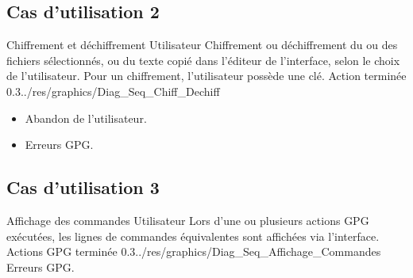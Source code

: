 \documentclass{../res/univ-projet}
\begin{document}
\subsection{Cas d'utilisation 2}
\ficheGraphic
{Chiffrement et déchiffrement}                   %
{Utilisateur}                                    %
{                                                %
  Chiffrement ou déchiffrement du ou des fichiers sélectionnés, ou du texte copié dans l'éditeur de l'interface, selon le choix de l'utilisateur.
}
{                                                %
  Pour un chiffrement, l'utilisateur possède une clé.
}                                               
{}                                               %
{Action terminée}                                %
{0.3}{../res/graphics/Diag_Seq_Chiff_Dechiff} %
{                                                %
  \begin{itemize}
  \item Abandon de l'utilisateur.
  \item Erreurs GPG.
  \end{itemize}
}
\vspace{0.5cm}

\subsection{Cas d'utilisation 3}
\ficheGraphic
{Affichage des commandes}                        %
{Utilisateur}                                    %
{                                                %
  Lors d'une ou plusieurs actions GPG exécutées, les lignes de commandes équivalentes sont affichées via l'interface.
}
{}                                               %
{}                                               %
{Actions GPG terminée}                           %
{0.3}{../res/graphics/Diag_Seq_Affichage_Commandes} %
{                                                %
  Erreurs GPG.
}
\vspace{0.5cm}
\end{document}
